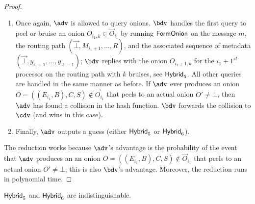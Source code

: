 \documentclass[runningheads,a4paper]{llncs}
\begin{document}
\begin{proof}
\begin{enumerate}
\item Once again, $\adv$ is allowed to query onions. 
$\bdv$ handles the first query to peel or bruise an onion $O_{i_1, k} \in \vec{O}_{i_1}$ by running $\mathsf{FormOnion}$ on the message $m$, the routing path $(\vec{\bot}, M_{i_1+1}, \dots, R)$, and the associated sequence of metadata $(\vec{\bot}, y_{i_1+1}, \dots, y_{\ell-1})$; $\bdv$ replies with the onion $O_{i_1+1, k}$ for the $i_1+1^\mathit{st}$ processor on the routing path with $k$ bruises, see $\mathsf{Hybrid}_{5}$. 
All other queries are handled in the same manner as before. 
If $\adv$ ever produces an onion $O = ((E_{i_1}, B), C, S) \not\in \vec{O}_{i_1}$ that peels to an actual onion $O'\not=\bot$, then $\adv$ has found a collision in the hash function. $\bdv$ forwards the collision to $\cdv$ (and wins in this case). 

\item Finally, $\adv$ outputs a guess (either $\mathsf{Hybrid}_{5}$ or $\mathsf{Hybrid}_{6}$). 
\end{enumerate}
The reduction works because $\adv$'s advantage is the probability of the event that $\adv$ produces an an onion $O = ((E_{i_1}, B), C, S) \not\in \vec{O}_{i_1}$ that peels to an actual onion $O'\not=\bot$; this is also $\bdv$'s advantage. Moreover, the reduction runs in polynomial time. 
\end{proof}
\fi 

\begin{lemma}
$\mathsf{Hybrid}_{5}$ and $\mathsf{Hybrid}_{6}$ are indistinguishable. 
\end{lemma}
\end{document}
